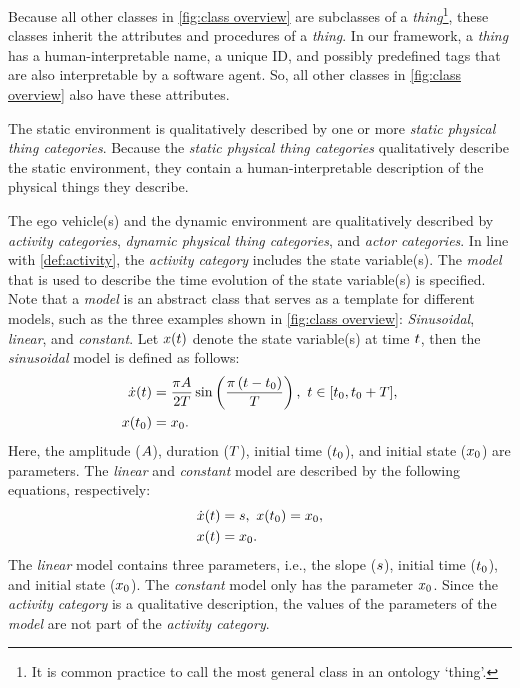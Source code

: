 \cstartb Because all other classes in \cref{fig:class overview} are subclasses of a \textit{thing}\cendb\cstarte\footnote{\cstarte It is common practice to call the most general class in an ontology `thing'.\cende}\cende\cstartb, these classes inherit the attributes and procedures of a \textit{thing}. In our framework, a \textit{thing} has a human-interpretable name, a unique ID, and possibly predefined tags that are also interpretable by a software agent. So, all other classes in \cref{fig:class overview} also have these attributes. \cendb

The static environment is qualitatively described by \cstarte one or more \cende\cstartc \textit{static physical thing categories}. \cendc
Because the \cstartc\textit{static physical thing categories} \cendc qualitatively describe the static environment, they contain a human-interpretable description of the \cstartc physical things they describe\cendc.

The ego vehicle\cstartd(s) \cendd and the dynamic environment are qualitatively described by \textit{activity categories}, \cstartb\textit{dynamic physical thing categories}\cendb, and \textit{actor categories}. 
In line with \cref{def:activity}, the \textit{activity category} includes the state variable(s).
The \textit{model} that is used to describe the time evolution of the state variable(s) is specified. 
\cstarte Note that a \textit{model} is an abstract class that serves as a template for different models, such as the three examples shown in \cref{fig:class overview}: \textit{Sinusoidal}, \textit{linear}, and \textit{constant}. 
Let $x(t)$ denote the state variable(s) at time $t$, then the \textit{sinusoidal} model is defined as follows:
\begin{align}
	\statedot(\time) &= \frac{\pi \amplitude}{2\duration} \sin \left( \frac{\pi \left( \time - \timeinit\right)}{\duration} \right),\ \time \in [\timeinit, \timeinit+\duration], \label{eq:sinusoidala} \\
	\state(\timeinit) &= \stateinit. \label{eq:sinusoidalb}
\end{align}
Here, the amplitude ($A$), duration ($T$), initial time ($t_{0}$), and initial state ($x_{0}$) are parameters. 
The \textit{linear} and \textit{constant} model are described by the following equations, respectively:
\begin{align}
	\statedot(\time) &= \slope,\ \state(\timeinit) = \stateinit, \label{eq:linear} \\
	\state(\time) &= \stateinit. \label{eq:constant}
\end{align}
The \textit{linear} model contains three parameters, i.e., the slope ($s$), initial time ($t_{0}$), and initial state ($x_{0}$). The \textit{constant} model only has the parameter $x_{0}$.
Since the \textit{activity category} is a qualitative description, the values of the parameters of the \textit{model} are not part of the \textit{activity category}. \cende

